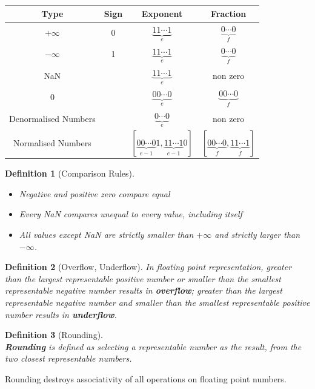 \documentclass[12pt]{article}
\newtheorem{definition}{Definition}[section]
\theoremstyle{definition}
\begin{document}
\begin{table}[h]
\centering
\begin{tabular}{|c|c|c|c|}
\hline
Type&Sign&Exponent&Fraction\\\hline
$+\infty$&0&$\underbrace{11\cdots1}_{e}$& $\underbrace{0\cdots0}_{f}$\\\hline
$-\infty$&1&$\underbrace{11\cdots1}_{e}$& $\underbrace{0\cdots0}_{f}$\\\hline
NaN&&$\underbrace{11\cdots1}_{e}$& non zero\\\hline
$0$&    &$\underbrace{00\cdots0}_{e}$       &$\underbrace{00\cdots0}_{f}$       \\\hline
Denormalised Numbers&&$\underbrace{0\cdots0}_{e}$& non zero\\\hline
Normalised Numbers&&$[\underbrace{00\cdots 0}_{e-1}1,\underbrace{11\cdots1}_{e-1}0]$&$[\underbrace{00\cdots 0}_{f},\underbrace{11\cdots1}_{f}]$\\\hline
\end{tabular}
\end{table}
\begin{definition}[Comparison Rules]
\hfill\\\normalfont 
\begin{itemize}
  \item Negative and positive zero compare \textit{equal}
  \item Every NaN compares \textit{unequal} to every value, including itself
  \item All values except NaN are strictly smaller than $+\infty$ and strictly larger than $-\infty$.
\end{itemize}
\end{definition}
\begin{definition}[Overflow, Underflow]
In floating point representation, greater than the largest representable positive number or smaller than the smallest representable negative number results in \textbf{overflow}; greater than the largest representable negative number and smaller than the smallest representable positive number results in \textbf{underflow}.
\end{definition}
\begin{definition}[Rounding]
\hfill\\\normalfont \textbf{Rounding} is defined as selecting a representable number as the result, from the two closest representable numbers.
\end{definition}
Rounding destroys associativity of all operations on floating point numbers.\\
\end{document}
